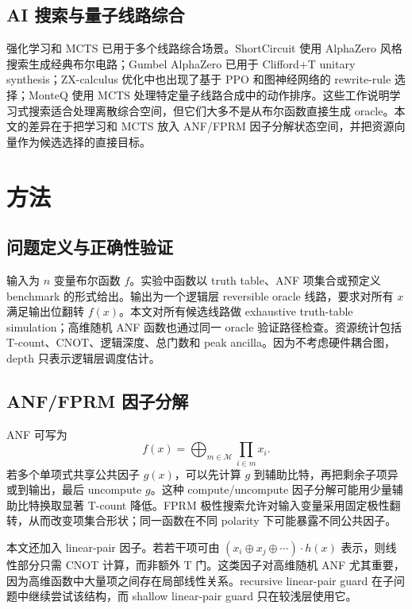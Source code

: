 \documentclass[UTF8,fontset=macnew,11pt]{ctexart}
\begin{document}
\subsection{AI 搜索与量子线路综合}

强化学习和 MCTS 已用于多个线路综合场景。ShortCircuit 使用 AlphaZero 风格搜索生成经典布尔电路\cite{tsaras2024shortcircuit}；Gumbel AlphaZero 已用于 Clifford+T unitary synthesis\cite{rietsch2024unitary}；ZX-calculus 优化中也出现了基于 PPO 和图神经网络的 rewrite-rule 选择\cite{riu2025zx}；MonteQ 使用 MCTS 处理特定量子线路合成中的动作排序\cite{machiya2026monteq}。这些工作说明学习式搜索适合处理离散综合空间，但它们大多不是从布尔函数直接生成 oracle。本文的差异在于把学习和 MCTS 放入 ANF/FPRM 因子分解状态空间，并把资源向量作为候选选择的直接目标。

\section{方法}

\subsection{问题定义与正确性验证}

输入为 $n$ 变量布尔函数 $f$。实验中函数以 truth table、ANF 项集合或预定义 benchmark 的形式给出。输出为一个逻辑层 reversible oracle 线路，要求对所有 $x$ 满足输出位翻转 $f(x)$。本文对所有候选线路做 exhaustive truth-table simulation；高维随机 ANF 函数也通过同一 oracle 验证路径检查。资源统计包括 T-count、CNOT、逻辑深度、总门数和 peak ancilla。因为不考虑硬件耦合图，depth 只表示逻辑层调度估计。

\subsection{ANF/FPRM 因子分解}

ANF 可写为
\begin{equation}
  f(x)=\bigoplus_{m\in \mathcal{M}} \prod_{i\in m} x_i .
\end{equation}
若多个单项式共享公共因子 $g(x)$，可以先计算 $g$ 到辅助比特，再把剩余子项异或到输出，最后 uncompute $g$。这种 compute/uncompute 因子分解可能用少量辅助比特换取显著 T-count 降低。FPRM 极性搜索允许对输入变量采用固定极性翻转，从而改变项集合形状；同一函数在不同 polarity 下可能暴露不同公共因子。

本文还加入 linear-pair 因子。若若干项可由 $(x_i\oplus x_j\oplus\cdots)\cdot h(x)$ 表示，则线性部分只需 CNOT 计算，而非额外 T 门。这类因子对高维随机 ANF 尤其重要，因为高维函数中大量项之间存在局部线性关系。recursive linear-pair guard 在子问题中继续尝试该结构，而 shallow linear-pair guard 只在较浅层使用它。
\end{document}

